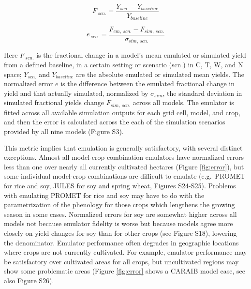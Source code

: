 \documentclass[gmd, manuscript]{copernicus} %
\begin{document}
\begin{equation}
    \label{eqn:per_yield}
    F_{\: scn.}=\frac{Y_{scn.}-Y_{baseline}}{Y_{baseline}}
\end{equation}

\begin{equation}
    \label{eqn:error}
    e_{\: scn.} =\frac{F_{em, \: scn.}-F_{sim, \: scn.}}{\sigma_{sim, \: scn.}}
\end{equation}

Here $F_{\: scn.}$ is the fractional change in a model's mean emulated or simulated yield from a defined baseline, in a certain setting or scenario (scn.) in C, T, W, and N space; $Y_{scn.}$ and $Y_{baseline}$ are the absolute emulated or simulated mean yields. The normalized error $e$ is the difference between the emulated fractional change in yield and that actually simulated, normalized by $\sigma_{sim}$, the standard deviation in simulated fractional yields change $F_{sim,\: scn.}$ across all models. The emulator is fitted across all available simulation outputs for each grid cell, model, and crop, and then the error is calculated across the each of the simulation scenarios provided by all nine models (Figure S3). 

This metric implies that emulation is generally satisfactory, with several distinct exceptions. Almost all model-crop combination emulators have normalized errors less than one over nearly all currently cultivated hectares (Figure \ref{fig:error}), but some individual model-crop combinations are difficult to emulate (e.g.\ PROMET for rice and soy, JULES for soy and spring wheat, Figures S24-S25). Problems with emulating PROMET for rice and soy may have to do with the parametrization of the phenology for those crops which lengthens the growing season in some cases. Normalized errors for soy are somewhat higher across all models not because emulator fidelity is worse but because models agree more closely on yield changes for soy than for other crops (see Figure S18), lowering the denominator. Emulator performance often degrades in geographic locations where crops are not currently cultivated. For example, emulator performance may be satisfactory over cultivated areas for all crops, but uncultivated regions may show some problematic areas (Figure \ref{fig:error} shows a CARAIB model case, see also Figure S26).
\end{document}
